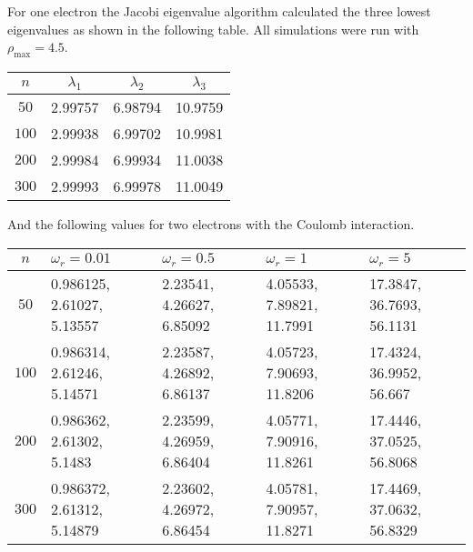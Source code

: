 For one electron the Jacobi eigenvalue algorithm calculated the
three lowest eigenvalues as shown in the following table. All
simulations were run with $\rho_{\text{max}} = 4.5$.
\begin{center}
    \begin{tabular}{|c|c|c|c|}
        \hline
        $n$ & $\lambda_1$ & $\lambda_2$ & $\lambda_3$ \\
        \hline
        \hline
        $50$ & 2.99757 & 6.98794 & 10.9759 \\
        \hline
        $100$ & 2.99938 & 6.99702 & 10.9981 \\
        \hline
        $200$ & 2.99984 & 6.99934 & 11.0038 \\
        \hline
        $300$ & 2.99993 & 6.99978 & 11.0049 \\
        \hline
    \end{tabular}
\end{center}
And the following values for two electrons with the Coulomb
interaction.
\begin{center}
    \begin{tabular}{|c|p{1.5cm}|p{1.5cm}|p{1.5cm}|p{1.5cm}|}
        \hline
        $n$ & $\omega_r = 0.01$ & $\omega_r = 0.5$ & $\omega_r = 1$
        & $\omega_r = 5$ \\
        \hline
        \hline
        $50$ & 0.986125, 2.61027, 5.13557 & 2.23541, 4.26627, 6.85092 &
        4.05533, 7.89821, 11.7991 & 17.3847, 36.7693, 56.1131 \\
        \hline
        $100$ & 0.986314, 2.61246, 5.14571 & 2.23587, 4.26892, 6.86137
        & 4.05723, 7.90693, 11.8206 & 17.4324, 36.9952, 56.667 \\
        \hline
        $200$ & 0.986362, 2.61302, 5.1483 & 2.23599, 4.26959, 6.86404 &
        4.05771, 7.90916, 11.8261 & 17.4446, 37.0525, 56.8068 \\
        \hline
        $300$ & 0.986372, 2.61312, 5.14879 & 2.23602, 4.26972, 6.86454
        & 4.05781, 7.90957, 11.8271 & 17.4469, 37.0632, 56.8329 \\
        \hline
    \end{tabular}
\end{center}
